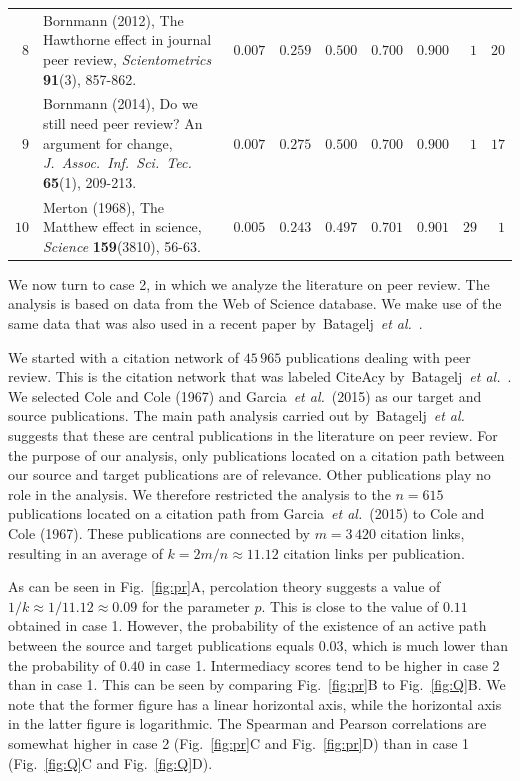 \documentclass[9pt,twocolumn,twoside]{pnas-alt} %
\theoremstyle{definition}
\newcommand{\subfigref}[2]{Fig.~\ref{fig:#1}#2\xspace}
\renewcommand{\etal}{~\emph{et al.}\xspace}
\begin{document}
\begin{sansmath}
\begin{table}[b!]
\begin{tabular}{rp{9.75cm}rrrrrrr}
    $8$ & Bornmann (2012), The Hawthorne effect in journal peer review, \textit{Scientometrics} \textbf{91}(3), 857-862. & $0.007$ & $0.259$ & $0.500$ & $0.700$ & $0.900$ & $1$ & $20$ \\
    $9$ & Bornmann (2014), Do we still need peer review? An argument for change, \textit{J.\ Assoc.\ Inf.\ Sci.\ Tec.} \textbf{65}(1), 209-213. & $0.007$ & $0.275$ & $0.500$ & $0.700$ & $0.900$ & $1$ & $17$ \\
    $10$ & Merton (1968), The Matthew effect in science, \textit{Science} \textbf{159}(3810), 56-63. & $0.005$ & $0.243$ & $0.497$ & $0.701$ & $0.901$ & $29$ & $1$ \\\bottomrule
  \end{tabular}
  \label{tbl:pr}
\end{table}\end{sansmath}

We now turn to case 2, in which we analyze the literature on peer review. The analysis is based on data from the Web of Science database. We make use of the same data that was also used in a recent paper by~Batagelj\etal~\cite{Batagelj2017}.

We started with a citation network of $45\,965$ publications dealing with peer review. This is the citation network that was labeled CiteAcy by~Batagelj\etal~\cite{Batagelj2017}. We selected Cole and Cole (1967) and Garcia\etal~(2015) as our target and source publications. The main path analysis carried out by~Batagelj\etal~\cite{Batagelj2017} suggests that these are central publications in the literature on peer review. For the purpose of our analysis, only publications located on a citation path between our source and target publications are of relevance. Other publications play no role in the analysis. We therefore restricted the analysis to the $n = 615$ publications located on a citation path from Garcia\etal~(2015) to Cole and Cole (1967). These publications are connected by $m = 3\,420$ citation links, resulting in an average of $k = 2m / n \approx 11.12$ citation links per publication.

As can be seen in \subfigref{pr}{A}, percolation theory suggests a value of $1 / k \approx 1 / 11.12 \approx 0.09$ for the parameter $p$. This is close to the value of $0.11$ obtained in case 1. However, the probability of the existence of an active path between the source and target publications equals $0.03$, which is much lower than the probability of $0.40$ in case 1. Intermediacy scores tend to be higher in case 2 than in case 1. This can be seen by comparing \subfigref{pr}{B} to \subfigref{Q}{B}. We note that the former figure has a linear horizontal axis, while the horizontal axis in the latter figure is logarithmic. The Spearman and Pearson correlations are somewhat higher in case 2 (\subfigref{pr}{C} and \subfigref{pr}{D}) than in case 1 (\subfigref{Q}{C} and \subfigref{Q}{D}).
\end{document}

